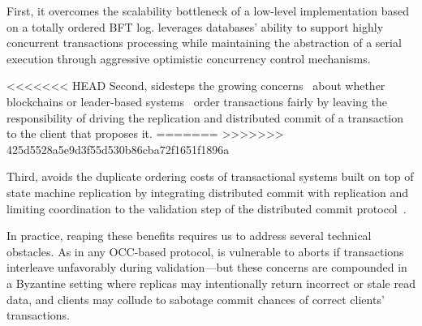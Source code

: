 First, it overcomes the scalability bottleneck of a low-level
implementation based on a totally ordered BFT log. \sys leverages databases' ability to support highly concurrent
transactions processing while maintaining the abstraction of a serial execution through aggressive optimistic concurrency control
mechanisms.

<<<<<<< HEAD
Second, \sys{} sidesteps the growing concerns~\cite{herlihy2016enhancing} about whether blockchains or leader-based systems~\cite{Kotla07Zyzzyva,castro1999practical} order transactions fairly by leaving the responsibility of driving the replication and distributed commit of a transaction to the client that proposes it.
=======
>>>>>>> 425d5528a5e9d3f55d530b86cba72f1651f1896a

Third, \sys{} avoids the duplicate ordering costs of transactional systems
built on top of state machine replication by integrating distributed commit with 
replication and
limiting coordination to the validation step of the distributed commit
protocol~\cite{zhang2015tapir,mu2016consolidating}.

In practice, reaping these benefits requires us to address several
technical obstacles. As in any OCC-based protocol, \sys
is vulnerable to aborts if transactions interleave unfavorably during
validation---but these concerns are compounded in a Byzantine
setting where replicas may intentionally return incorrect or stale read data, and clients may collude to sabotage commit chances of correct clients' transactions.

